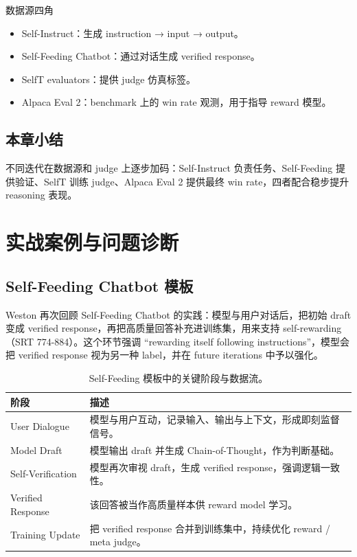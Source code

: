 \documentclass[a4paper]{article}
\begin{document}
\begin{importantbox}{数据源四角}
\begin{itemize}
    \item Self-Instruct：生成 instruction → input → output。
    \item Self-Feeding Chatbot：通过对话生成 verified response。
    \item SelfT evaluators：提供 judge 仿真标签。
    \item Alpaca Eval 2：benchmark 上的 win rate 观测，用于指导 reward 模型。
\end{itemize}
\end{importantbox}

\subsection{本章小结}
不同迭代在数据源和 judge 上逐步加码：Self-Instruct 负责任务、Self-Feeding 提供验证、SelfT 训练 judge、Alpaca Eval 2 提供最终 win rate，四者配合稳步提升 reasoning 表现。

\section{实战案例与问题诊断}
\subsection{Self-Feeding Chatbot 模板}
Weston 再次回顾 Self-Feeding Chatbot 的实践：模型与用户对话后，把初始 draft 变成 verified response，再把高质量回答补充进训练集，用来支持 self-rewarding（SRT 774-884）。这个环节强调 ``rewarding itself following instructions''，模型会把 verified response 视为另一种 label，并在 future iterations 中予以强化。

\begin{table}[H]
\centering
\begin{tabular}{p{4cm}p{10cm}}
\toprule
阶段 & 描述 \\
\midrule
User Dialogue & 模型与用户互动，记录输入、输出与上下文，形成即刻监督信号。 \\
Model Draft & 模型输出 draft 并生成 Chain-of-Thought，作为判断基础。 \\
Self-Verification & 模型再次审视 draft，生成 verified response，强调逻辑一致性。 \\
Verified Response & 该回答被当作高质量样本供 reward model 学习。 \\
Training Update & 把 verified response 合并到训练集中，持续优化 reward / meta judge。 \\
\bottomrule
\end{tabular}
\caption{Self-Feeding 模板中的关键阶段与数据流。}
\end{table}
\end{document}
